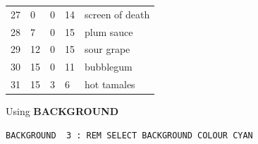 \begin{description}[leftmargin=2cm,style=nextline]
\begin{center}
{\begin{center}
\begin{tabular}{*{4}{|R{1.2cm}}|l|}
 27 &    0  &   0   &  14  & screen of death\\
 28 &    7  &   0   &  15  & plum sauce\\
 29 &   12  &   0   &  15  & sour grape\\
 30 &   15  &   0   &  11  & bubblegum\\
 31 &   15  &   3   &   6  & hot tamales\\
\hline
\end{tabular}
\end{center}
}
\end{center}
\item [Example:] Using {\bf BACKGROUND}
\begin{tcolorbox}[colback=black,coltext=white]
\verbatimfont{\codefont}
\begin{verbatim}
BACKGROUND  3 : REM SELECT BACKGROUND COLOUR CYAN
\end{verbatim}
\end{tcolorbox}
\end{description}


\newpage
